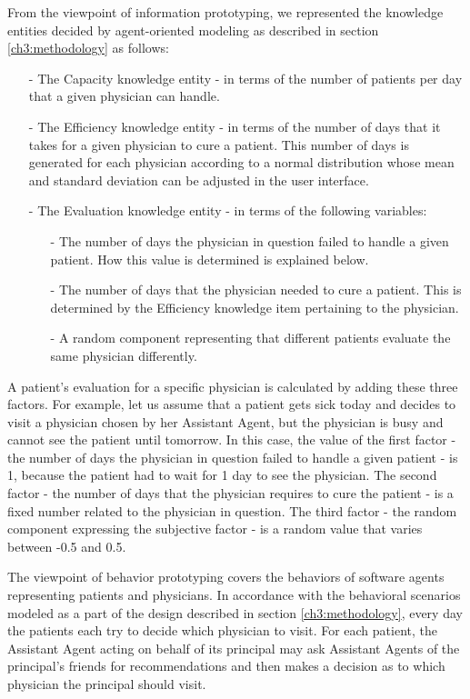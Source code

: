 From the viewpoint of information prototyping, we represented the knowledge entities decided by agent-oriented modeling as described in section \ref{ch3:methodology} as follows:
\begin{itemize}
\item[-]The Capacity knowledge entity - in terms of the number of patients per day that a given physician can handle.
\item[-]The Efficiency knowledge entity - in terms of the number of days that it takes for a given physician to cure a patient. This number of days is generated for each physician according to a normal distribution whose mean and standard deviation can be adjusted in the user interface.
\item[-]The Evaluation knowledge entity - in terms of the following variables:
\begin{itemize}
\item[-]The number of days the physician in question failed to handle a given patient. How this value is determined is explained below.
\item[-]The number of days that the physician needed to cure a patient. This is determined by the Efficiency knowledge item pertaining to the physician.
\item[-]A random component representing that different patients evaluate the same physician differently.
\end{itemize}
\end{itemize}
	
A patient's evaluation for a specific physician is calculated by adding these three factors. For example, let us assume that a patient gets sick today and decides to visit a physician chosen by her Assistant Agent, but the physician is busy and cannot see the patient until tomorrow. In this case, the value of the first factor - the number of days the physician in question failed to handle a given patient - is 1, because the patient had to wait for 1 day to see the physician. The second factor - the number of days that the physician requires to cure the patient - is a fixed number related to the physician in question. The third factor - the random component expressing the subjective factor - is a random value that varies between -0.5 and 0.5.

The viewpoint of behavior prototyping covers the behaviors of software agents representing patients and physicians. In accordance with the behavioral scenarios modeled as a part of the design described in section \ref{ch3:methodology}, every day the patients each try to decide which physician to visit. For each patient, the Assistant Agent acting on behalf of its principal may ask Assistant Agents of the principal's friends for recommendations and then makes a decision as to which physician the principal should visit.


